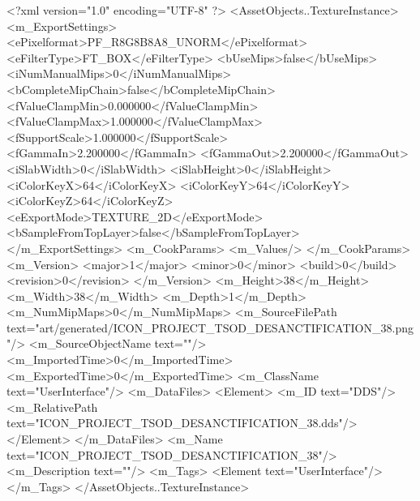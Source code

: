 <?xml version="1.0" encoding="UTF-8" ?>
<AssetObjects..TextureInstance>
	<m_ExportSettings>
		<ePixelformat>PF_R8G8B8A8_UNORM</ePixelformat>
		<eFilterType>FT_BOX</eFilterType>
		<bUseMips>false</bUseMips>
		<iNumManualMips>0</iNumManualMips>
		<bCompleteMipChain>false</bCompleteMipChain>
		<fValueClampMin>0.000000</fValueClampMin>
		<fValueClampMax>1.000000</fValueClampMax>
		<fSupportScale>1.000000</fSupportScale>
		<fGammaIn>2.200000</fGammaIn>
		<fGammaOut>2.200000</fGammaOut>
		<iSlabWidth>0</iSlabWidth>
		<iSlabHeight>0</iSlabHeight>
		<iColorKeyX>64</iColorKeyX>
		<iColorKeyY>64</iColorKeyY>
		<iColorKeyZ>64</iColorKeyZ>
		<eExportMode>TEXTURE_2D</eExportMode>
		<bSampleFromTopLayer>false</bSampleFromTopLayer>
	</m_ExportSettings>
	<m_CookParams>
		<m_Values/>
	</m_CookParams>
	<m_Version>
		<major>1</major>
		<minor>0</minor>
		<build>0</build>
		<revision>0</revision>
	</m_Version>
	<m_Height>38</m_Height>
	<m_Width>38</m_Width>
	<m_Depth>1</m_Depth>
	<m_NumMipMaps>0</m_NumMipMaps>
	<m_SourceFilePath text="art/generated/ICON_PROJECT_TSOD_DESANCTIFICATION_38.png"/>
	<m_SourceObjectName text=""/>
	<m_ImportedTime>0</m_ImportedTime>
	<m_ExportedTime>0</m_ExportedTime>
	<m_ClassName text="UserInterface"/>
	<m_DataFiles>
		<Element>
			<m_ID text="DDS"/>
			<m_RelativePath text="ICON_PROJECT_TSOD_DESANCTIFICATION_38.dds"/>
		</Element>
	</m_DataFiles>
	<m_Name text="ICON_PROJECT_TSOD_DESANCTIFICATION_38"/>
	<m_Description text=""/>
	<m_Tags>
		<Element text="UserInterface"/>
	</m_Tags>
</AssetObjects..TextureInstance>
